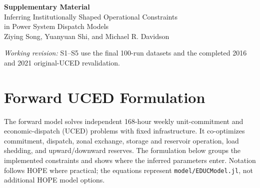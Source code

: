 \documentclass[11pt,a4paper]{article}
\begin{document}
\begin{center}
{\LARGE\bfseries Supplementary Material}\\[5pt]
{\large Inferring Institutionally Shaped Operational Constraints\\
in Power System Dispatch Models}\\[6pt]
Ziying Song, Yuanyuan Shi, and Michael R. Davidson
\end{center}
{\small\textit{Working revision:} S1--S5 use the final 100-run datasets and
the completed 2016 and 2021 original-UCED revalidation.}

\section{Forward UCED Formulation}
The forward model solves independent 168-hour weekly unit-commitment and
economic-dispatch (UCED) problems with fixed infrastructure. It co-optimizes
commitment, dispatch, zonal exchange, storage and reservoir operation, load
shedding, and upward/downward reserves. The formulation below groups the
implemented constraints and shows where the inferred parameters enter.
Notation follows HOPE where practical; the equations represent
\texttt{model/EDUCModel.jl}, not additional HOPE model options.
\end{document}
